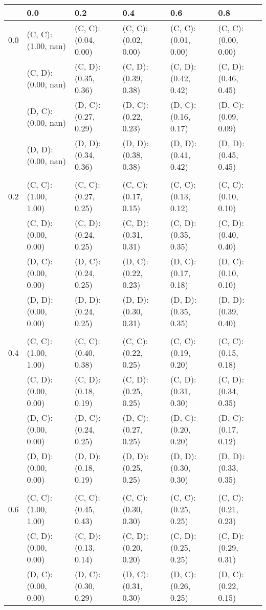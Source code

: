 \begin{tabular}{ l | l l l l l }
& 0.0 & 0.2 & 0.4 & 0.6 & 0.8 \\ 
\hline 
0.0 & (C, C): (1.00, nan) & (C, C): (0.04, 0.00) & (C, C): (0.02, 0.00) & (C, C): (0.01, 0.00) & (C, C): (0.00, 0.00) \\ 
 & (C, D): (0.00, nan) & (C, D): (0.35, 0.36) & (C, D): (0.39, 0.38) & (C, D): (0.42, 0.42) & (C, D): (0.46, 0.45) \\ 
 & (D, C): (0.00, nan) & (D, C): (0.27, 0.29) & (D, C): (0.22, 0.23) & (D, C): (0.16, 0.17) & (D, C): (0.09, 0.09) \\ 
 & (D, D): (0.00, nan) & (D, D): (0.34, 0.36) & (D, D): (0.38, 0.38) & (D, D): (0.41, 0.42) & (D, D): (0.45, 0.45) \\ 
\\
0.2 & (C, C): (1.00, 1.00) & (C, C): (0.27, 0.25) & (C, C): (0.17, 0.15) & (C, C): (0.13, 0.12) & (C, C): (0.10, 0.10) \\ 
 & (C, D): (0.00, 0.00) & (C, D): (0.24, 0.25) & (C, D): (0.31, 0.31) & (C, D): (0.35, 0.35) & (C, D): (0.40, 0.40) \\ 
 & (D, C): (0.00, 0.00) & (D, C): (0.24, 0.25) & (D, C): (0.22, 0.23) & (D, C): (0.17, 0.18) & (D, C): (0.10, 0.10) \\ 
 & (D, D): (0.00, 0.00) & (D, D): (0.24, 0.25) & (D, D): (0.30, 0.31) & (D, D): (0.35, 0.35) & (D, D): (0.39, 0.40) \\ 
\\ 
0.4 & (C, C): (1.00, 1.00) & (C, C): (0.40, 0.38) & (C, C): (0.22, 0.25) & (C, C): (0.19, 0.20) & (C, C): (0.15, 0.18) \\ 
 & (C, D): (0.00, 0.00) & (C, D): (0.18, 0.19) & (C, D): (0.25, 0.25) & (C, D): (0.31, 0.30) & (C, D): (0.34, 0.35) \\ 
 & (D, C): (0.00, 0.00) & (D, C): (0.24, 0.25) & (D, C): (0.27, 0.25) & (D, C): (0.20, 0.20) & (D, C): (0.17, 0.12) \\ 
 & (D, D): (0.00, 0.00) & (D, D): (0.18, 0.19) & (D, D): (0.25, 0.25) & (D, D): (0.30, 0.30) & (D, D): (0.33, 0.35) \\ 
\\ 
0.6 & (C, C): (1.00, 1.00) & (C, C): (0.45, 0.43) & (C, C): (0.30, 0.30) & (C, C): (0.25, 0.25) & (C, C): (0.21, 0.23) \\ 
 & (C, D): (0.00, 0.00) & (C, D): (0.13, 0.14) & (C, D): (0.20, 0.20) & (C, D): (0.25, 0.25) & (C, D): (0.29, 0.31) \\ 
 & (D, C): (0.00, 0.00) & (D, C): (0.30, 0.29) & (D, C): (0.31, 0.30) & (D, C): (0.26, 0.25) & (D, C): (0.22, 0.15) \\ 

\end{tabular}
